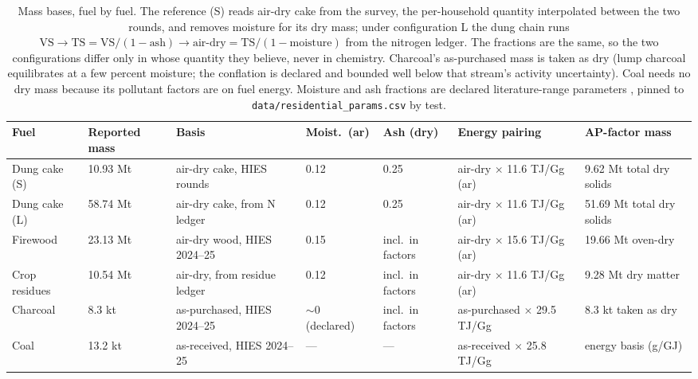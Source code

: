 \begin{table}[tbp]
\centering
\scriptsize
\begin{tabular}{@{}lllllll@{}}
\toprule
\textbf{Fuel} & \textbf{Reported mass} & \textbf{Basis} & \textbf{Moist.\ (ar)} &
\textbf{Ash (dry)} & \textbf{Energy pairing} & \textbf{AP-factor mass} \\
\midrule
Dung cake (S)  & 10.93 Mt & air-dry cake, HIES rounds     & 0.12 & 0.25 &
  air-dry $\times$ 11.6 TJ/Gg (ar) & 9.62 Mt total dry solids \\
Dung cake (L)  & 58.74 Mt & air-dry cake, from N ledger  & 0.12 & 0.25 &
  air-dry $\times$ 11.6 TJ/Gg (ar) & 51.69 Mt total dry solids \\
Firewood       & 23.13 Mt & air-dry wood, HIES 2024--25  & 0.15 & incl.\ in factors &
  air-dry $\times$ 15.6 TJ/Gg (ar) & 19.66 Mt oven-dry \\
Crop residues  & 10.54 Mt & air-dry, from residue ledger & 0.12 & incl.\ in factors &
  air-dry $\times$ 11.6 TJ/Gg (ar) & 9.28 Mt dry matter \\
Charcoal       & 8.3 kt   & as-purchased, HIES 2024--25  & $\sim$0 (declared) & incl.\ in factors &
  as-purchased $\times$ 29.5 TJ/Gg & 8.3 kt taken as dry \\
Coal           & 13.2 kt  & as-received, HIES 2024--25   & --- & --- &
  as-received $\times$ 25.8 TJ/Gg  & energy basis (g/GJ) \\
\bottomrule
\end{tabular}
\caption{Mass bases, fuel by fuel. The reference (S) reads air-dry cake from the survey,
the per-household quantity interpolated between the two rounds, and removes moisture for
its dry mass; under configuration L the dung chain runs
$\mathrm{VS} \rightarrow \mathrm{TS} = \mathrm{VS}/(1-\text{ash}) \rightarrow
\text{air-dry} = \mathrm{TS}/(1-\text{moisture})$ from the nitrogen ledger. The fractions
are the same, so the two configurations differ
only in whose quantity they believe, never in chemistry. Charcoal's as-purchased mass is
taken as dry (lump charcoal equilibrates at a few percent moisture; the conflation is
declared and bounded well below that stream's activity uncertainty). Coal needs no dry
mass because its pollutant factors are on fuel energy. Moisture and ash fractions are
declared literature-range parameters \citep{szymajda2019}, pinned to
\texttt{data/residential\_params.csv} by test.}
\label{tab:massbases}
\end{table}

